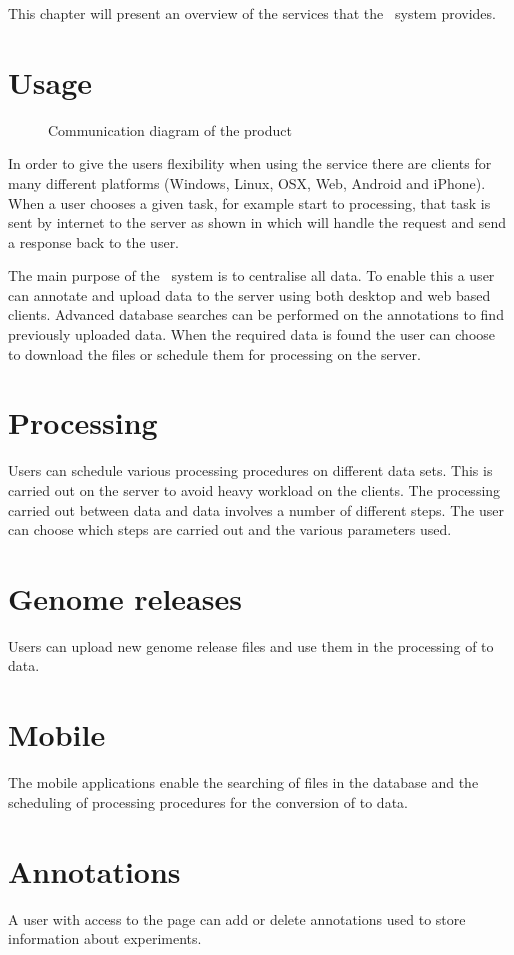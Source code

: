 


This chapter will present an overview of the services that the \appName\ system provides. 

\section{Usage}

\begin{figure}[h]
\caption{Communication diagram of the product}
\label{con_serviceDescription}
\end{figure}
	
In order to give the users flexibility when using the service there are clients for many different platforms (Windows, Linux, OSX, Web, Android and iPhone). 
When a user chooses a given task, for example start  to  processing, that task is sent by internet to the server as shown in  which will handle the request and send a response back to the user.

The main purpose of the \appName\ system is to centralise all data. To enable this a user can annotate and upload data to the server using both desktop and web based clients. 
Advanced database searches can be performed on the annotations to find previously uploaded data. When the required data is found the user can choose to download the files or schedule them for processing on the server.

\section{Processing}
Users can schedule various processing procedures on different data sets. This is carried out on the server to avoid heavy workload on the clients. The processing carried out between  data and  data involves a number of different steps. The user can choose which steps are carried out and the various parameters used.

\section{Genome releases}
Users can upload new genome release files and use them in the processing of  to  data.

\section{Mobile}
The mobile applications enable the searching of files in the database and the scheduling of processing procedures for the conversion of  to  data.

\section{Annotations}
A user with access to the  page can add or delete annotations used to store information about experiments.


